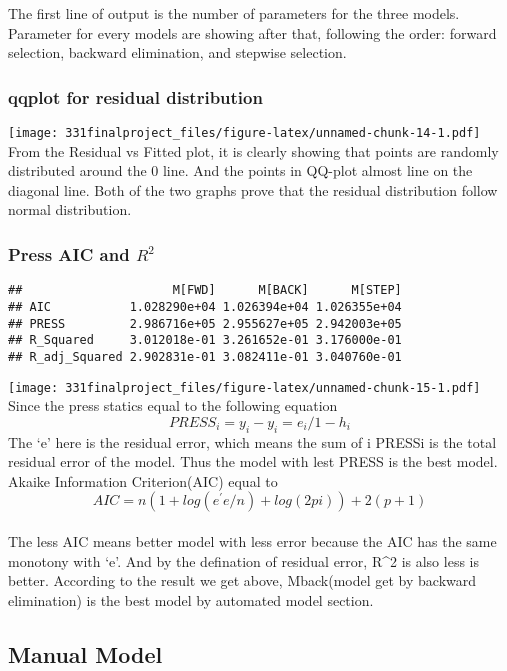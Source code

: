 \documentclass[]{article}
\begin{document}
The first line of output is the number of parameters for the three
models. Parameter for every models are showing after that, following the
order: forward selection, backward elimination, and stepwise selection.

\subsubsection{qqplot for residual
distribution}\label{qqplot-for-residual-distribution}

\texttt{[image: 331finalproject\_files/figure-latex/unnamed-chunk-14-1.pdf]}
From the Residual vs Fitted plot, it is clearly showing that points are
randomly distributed around the 0 line. And the points in QQ-plot almost
line on the diagonal line. Both of the two graphs prove that the
residual distribution follow normal distribution.

\subsubsection{\texorpdfstring{Press AIC and
\(R^2\)}{Press AIC and R\^{}2}}\label{press-aic-and-r2}

\begin{verbatim}
##                     M[FWD]      M[BACK]      M[STEP]
## AIC           1.028290e+04 1.026394e+04 1.026355e+04
## PRESS         2.986716e+05 2.955627e+05 2.942003e+05
## R_Squared     3.012018e-01 3.261652e-01 3.176000e-01
## R_adj_Squared 2.902831e-01 3.082411e-01 3.040760e-01
\end{verbatim}

\texttt{[image: 331finalproject\_files/figure-latex/unnamed-chunk-15-1.pdf]}
Since the press statics equal to the following equation \[
PRESS_{i} = y_{i} - y_{i} = e_{i} / 1 - h_{i} 
\] The `e' here is the residual error, which means the sum of i PRESSi
is the total residual error of the model. Thus the model with lest PRESS
is the best model.\\
Akaike Information Criterion(AIC) equal to \[
AIC = n(1+log(e^{'}e/n) + log(2pi))+2(p+1)
\]\\
The less AIC means better model with less error because the AIC has the
same monotony with `e'. And by the defination of residual error, R\^{}2
is also less is better. According to the result we get above,
Mback(model get by backward elimination) is the best model by automated
model section.

\subsection{Manual Model}
\end{document}
